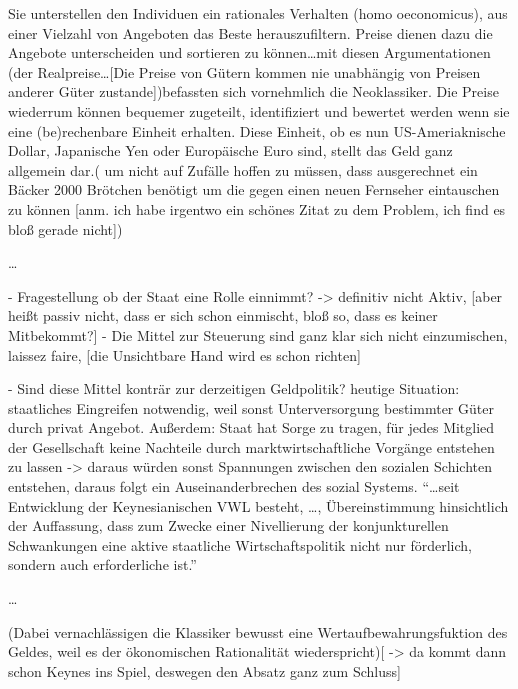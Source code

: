 \documentclass[
        onecolumn,
        a4paper,
        abstracton,
        parskip=half
        ,final
        ]{scrartcl}
\begin{document}
    Sie unterstellen den Individuen ein rationales Verhalten (homo oeconomicus), aus einer
     Vielzahl von Angeboten das Beste herauszufiltern. Preise dienen dazu die Angebote
    unterscheiden und sortieren zu k{\"o}nnen\ldots mit diesen Argumentationen  (der Realpreise\ldots[Die
    Preise von G{\"u}tern kommen nie unabh{\"a}ngig von Preisen anderer G{\"u}ter zustande])befassten sich
    vornehmlich die Neoklassiker. Die Preise wiederrum k{\"o}nnen bequemer zugeteilt,
    identifiziert und bewertet werden wenn sie eine (be)rechenbare Einheit erhalten.
    Diese Einheit, ob es nun US-Ameriaknische Dollar, Japanische Yen oder Europ{\"a}ische Euro
    sind, stellt das Geld ganz allgemein dar.( um nicht auf Zuf{\"a}lle hoffen zu m{\"u}ssen, dass
    ausgerechnet ein B{\"a}cker 2000 Br{\"o}tchen ben{\"o}tigt um die gegen einen neuen Fernseher eintauschen zu k{\"o}nnen [anm. ich habe irgentwo ein sch{\"o}nes Zitat zu dem Problem, ich find es blo{\ss} gerade nicht])

    \ldots

    - Fragestellung ob der Staat eine Rolle einnimmt? -> definitiv nicht Aktiv,
    [aber hei{\ss}t passiv nicht, dass er sich schon einmischt, blo{\ss} so, dass es keiner Mitbekommt?]
    - Die Mittel zur Steuerung sind ganz klar sich nicht einzumischen, laissez faire,
    [die Unsichtbare Hand wird es schon richten]


    - Sind diese Mittel kontr{\"a}r zur derzeitigen Geldpolitik?
    heutige Situation: staatliches Eingreifen notwendig, weil sonst Unterversorgung bestimmter
    G{\"u}ter durch privat Angebot. Au{\ss}erdem: Staat hat Sorge zu tragen, f{\"u}r jedes Mitglied der
    Gesellschaft keine Nachteile durch marktwirtschaftliche Vorg{\"a}nge entstehen zu lassen -> daraus
    w{\"u}rden sonst Spannungen zwischen den sozialen Schichten entstehen, daraus folgt ein
    Auseinanderbrechen des sozial Systems. "`\ldots seit Entwicklung der Keynesianischen VWL besteht,
    \ldots, {\"U}bereinstimmung hinsichtlich der Auffassung, dass zum Zwecke einer Nivellierung der
    konjunkturellen Schwankungen eine aktive staatliche Wirtschaftspolitik nicht nur f{\"o}rderlich,
     sondern auch erforderliche ist."'

    \ldots

    (Dabei vernachl{\"a}ssigen die Klassiker bewusst eine Wertaufbewahrungsfuktion des Geldes, weil es
    der {\"o}konomischen Rationalit{\"a}t wiederspricht)[ -> da kommt dann schon Keynes ins Spiel, deswegen
    den Absatz ganz zum Schluss]
\end{document}
